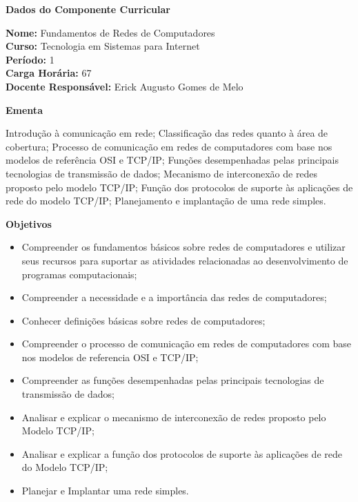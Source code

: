 

\begin{snugshade}\begin{center}\textbf{
	Dados do Componente Curricular
}\end{center}\end{snugshade}

\noindent 	\textbf{Nome:} Fundamentos de Redes de Computadores
\\ 			\textbf{Curso:} Tecnologia em Sistemas para Internet
\\ 			\textbf{Período:} \unit{1}{\degree}
\\ 			\textbf{Carga Horária:} \unit{67}{\hour}
\\ 			\textbf{Docente Responsável:} Erick Augusto Gomes de Melo


\begin{snugshade}\begin{center}\textbf{
    Ementa
\vphantom{q}}\end{center}\end{snugshade}

\noindent

Introdução à comunicação em rede; Classificação das redes quanto à área de cobertura; Processo de comunicação em redes de computadores com base nos modelos de referência OSI e TCP/IP; Funções desempenhadas pelas principais tecnologias de transmissão de dados; Mecanismo de interconexão de redes proposto pelo modelo TCP/IP; Função dos protocolos de suporte às aplicações de rede do modelo TCP/IP; Planejamento e implantação de uma rede simples.


\begin{snugshade}\begin{center}\textbf{
    Objetivos
}\end{center}\end{snugshade}


\begin{itemize}

\item Compreender os fundamentos básicos sobre redes de computadores e utilizar seus recursos para suportar as atividades relacionadas ao desenvolvimento de programas computacionais;
\item Compreender a necessidade e a importância das redes de computadores;
\item Conhecer definições básicas sobre redes de computadores;
\item Compreender o processo de comunicação em redes de computadores com base nos modelos de referencia OSI e TCP/IP;
\item Compreender as funções desempenhadas pelas principais tecnologias de transmissão de dados;
\item Analisar e explicar o mecanismo de interconexão de redes proposto pelo Modelo TCP/IP;
\item Analisar e explicar a função dos protocolos de suporte às aplicações de rede do Modelo TCP/IP;
\item Planejar e Implantar uma rede simples.

\end{itemize} 

